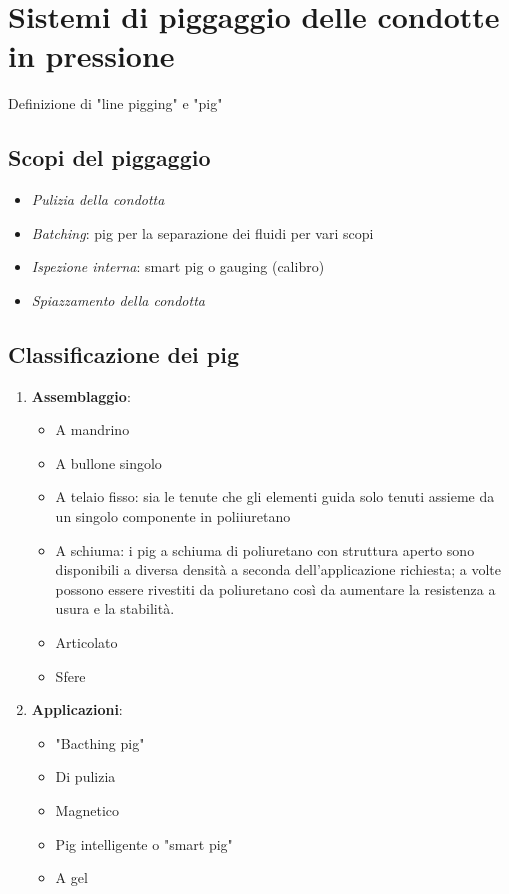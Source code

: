 \clearpage{\pagestyle{empty}\cleardoublepage}
\chapter{Sistemi di piggaggio delle condotte in pressione}
Definizione di "line pigging" e "pig"
\section{Scopi del piggaggio}
	\begin{itemize}
		\item \textit{Pulizia della condotta}
		\item \textit{Batching}: pig per la separazione dei fluidi per vari scopi
		\item \textit{Ispezione interna}: smart pig o gauging (calibro)
		\item \textit{Spiazzamento della condotta}
	\end{itemize}
\section{Classificazione dei pig}
\begin{enumerate}
	\item \textbf{Assemblaggio}:
	\begin{itemize}
		\item A mandrino 
		\item A bullone singolo
		\item A telaio fisso: sia le tenute che gli elementi guida solo tenuti assieme da un singolo componente in poliiuretano
		\item A schiuma: i pig a schiuma di poliuretano con struttura aperto sono disponibili a diversa densità a seconda dell'applicazione richiesta; a volte possono essere rivestiti da poliuretano così da aumentare la resistenza a usura e la stabilità.
		\item Articolato
		\item Sfere
	\end{itemize}
	\item \textbf{Applicazioni}:
	\begin{itemize}
		\item "Bacthing pig"
		\item Di pulizia
		\item Magnetico
		\item Pig intelligente o "smart pig"
		\item A gel
	\end{itemize}
\end{enumerate}

